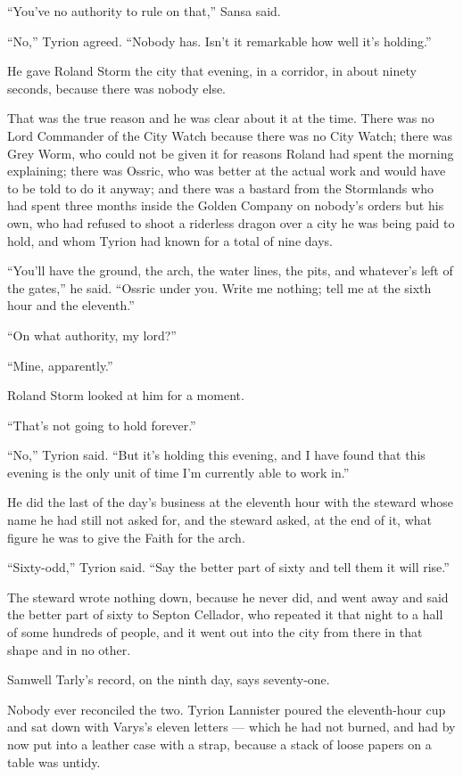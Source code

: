 “You’ve no authority to rule on that,” Sansa said.

“No,” Tyrion agreed. “Nobody has. Isn’t it remarkable how well it’s holding.”

\sceneBreak

He gave Roland Storm the city that evening, in a corridor, in about ninety seconds, because there was nobody else.

That was the true reason and he was clear about it at the time. There was no Lord Commander of the City Watch because there was no City Watch; there was Grey Worm, who could not be given it for reasons Roland had spent the morning explaining; there was Ossric, who was better at the actual work and would have to be told to do it anyway; and there was a bastard from the Stormlands who had spent three months inside the Golden Company on nobody’s orders but his own, who had refused to shoot a riderless dragon over a city he was being paid to hold, and whom Tyrion had known for a total of nine days.

“You’ll have the ground, the arch, the water lines, the pits, and whatever’s left of the gates,” he said. “Ossric under you. Write me nothing; tell me at the sixth hour and the eleventh.”

“On what authority, my lord?”

“Mine, apparently.”

Roland Storm looked at him for a moment.

“That’s not going to hold forever.”

“No,” Tyrion said. “But it’s holding this evening, and I have found that this evening is the only unit of time I’m currently able to work in.”

\sceneBreak

He did the last of the day’s business at the eleventh hour with the steward whose name he had still not asked for, and the steward asked, at the end of it, what figure he was to give the Faith for the arch.

“Sixty-odd,” Tyrion said. “Say the better part of sixty and tell them it will rise.”

The steward wrote nothing down, because he never did, and went away and said the better part of sixty to Septon Cellador, who repeated it that night to a hall of some hundreds of people, and it went out into the city from there in that shape and in no other.

Samwell Tarly’s record, on the ninth day, says seventy-one.

Nobody ever reconciled the two. Tyrion Lannister poured the eleventh-hour cup and sat down with Varys’s eleven letters — which he had not burned, and had by now put into a leather case with a strap, because a stack of loose papers on a table was untidy.